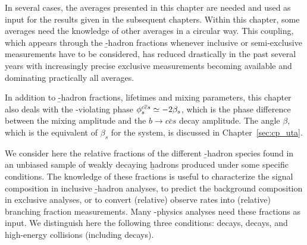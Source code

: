 In several cases, the averages presented in this chapter are 
needed and used as input for the results given in the subsequent chapters. 
Within this chapter, some averages need the knowledge of other 
averages in a circular way. This coupling, which appears through the 
\b-hadron fractions whenever inclusive or semi-exclusive measurements 
have to be considered, has reduced drastically in the past several years 
with increasingly precise exclusive measurements becoming available
and dominating practically all averages. 

In addition to \b-hadron fractions, lifetimes and 
mixing parameters, this chapter also deals with the 
\CP-violating phase $\phiccbars\simeq -2\beta_s$, which is the phase 
difference between the \Bs mixing amplitude and the 
$b\to c\bar{c}s$ decay amplitude. The angle $\beta$, 
which is the equivalent of $\beta_s$ for the \Bd 
system, is discussed in Chapter~\ref{sec:cp_uta}. 

 
We consider here the relative fractions of the different \b-hadron 
species found in an unbiased sample of weakly decaying \b hadrons 
produced under some specific conditions. The knowledge of these fractions
is useful to characterize the signal composition in inclusive \b-hadron 
analyses, to predict the background composition in exclusive analyses, 
or to convert (relative) observe rates into (relative) branching fraction 
measurements. 
Many \B-physics analyses need these fractions as input. We distinguish 
here the following three conditions: \Ups decays, \Upsfive decays, and 
high-energy collisions (including \Z decays). 


